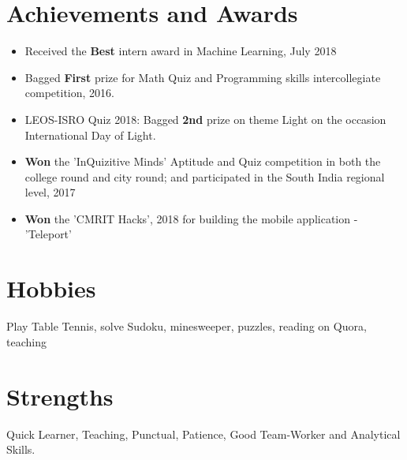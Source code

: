 \documentclass[margin, centered]{res}
\begin{document}
\begin{resume}
\section{Achievements and Awards}
\begin{itemize}[leftmargin=*]
 \item Received the \textbf{Best} intern award in Machine Learning, July 2018
 \item Bagged \textbf{First} prize for Math Quiz and Programming skills intercollegiate competition, 2016.
 \item LEOS-ISRO Quiz 2018: Bagged \textbf{2nd} prize on theme Light on the occasion International
Day of Light.
 \item \textbf{Won} the ’InQuizitive Minds’ Aptitude and Quiz competition in both the college round and city round;
and participated in the South India regional level, 2017
 \item \textbf{Won} the ’CMRIT Hacks’, 2018 for building the mobile application - ’Teleport’
\end{itemize}


\section{Hobbies}
Play Table Tennis, solve Sudoku, minesweeper, puzzles, reading on Quora, teaching

\section{Strengths}
Quick Learner, Teaching, Punctual, Patience, Good Team-Worker and Analytical Skills.

\end{resume}
\end{document}
